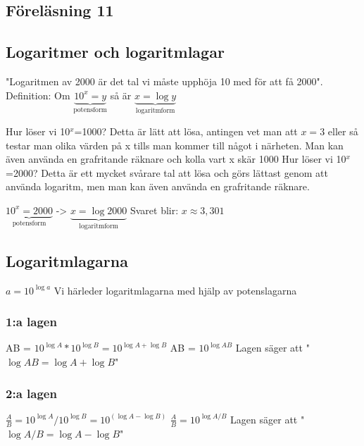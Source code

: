 \documentclass[a4paper,10pt]{article}
\begin{document}
\begin{flushleft}
\section{Föreläsning 11}
  \subsection{Logaritmer och logaritmlagar}
    "Logaritmen av 2000 är det tal vi måste upphöja 10 med för att få 2000".\newline\newline
    Definition: Om $ \underbrace{10^x = y}_{\text{potensform}} $ så är $ \underbrace{x=\log{y}}_{\text{logaritmform}} $\newline

    Hur löser vi 10$^x$=1000? Detta är lätt att lösa, antingen vet man att $x=3$ eller så testar man olika värden på x tills man kommer till något i närheten.
    Man kan även använda en grafritande räknare och kolla vart x skär 1000\newline
    Hur löser vi 10$^x$=2000? Detta är ett mycket svårare tal att lösa och görs lättast genom att använda logaritm, men man kan även använda en grafritande räknare.\newline

    $ \underbrace{10^x = 2000}_{\text{potensform}} $ -> $ \underbrace{x=\log{2000}}_{\text{logaritmform}} $\newline
    Svaret blir: $ x \approx 3,301 $

  \subsection{Logaritmlagarna}
    $ a = 10^{\log{a}}$ \newline
    Vi härleder logaritmlagarna med hjälp av potenslagarna
  \subsubsection{1:a lagen}
    AB = $10^{\log{A}}*10^{\log{B}} = 10^{\log{A}+\log{B}}$\newline
    AB = $ 10^{\log{AB}} $ \newline
    Lagen säger att "$\log{AB} = \log{A}+\log{B} $"
  \subsubsection{2:a lagen}
    $\frac{A}{B} = 10^{\log{A}}/10^{\log{B}} = 10^{(\log{A}-\log{B})}$\newline
    $\frac{A}{B} = 10^{\log{A/B}} $ \newline
    Lagen säger att "$\log{A/B} = \log{A}-\log{B} $"

\end{flushleft}
\end{document}
